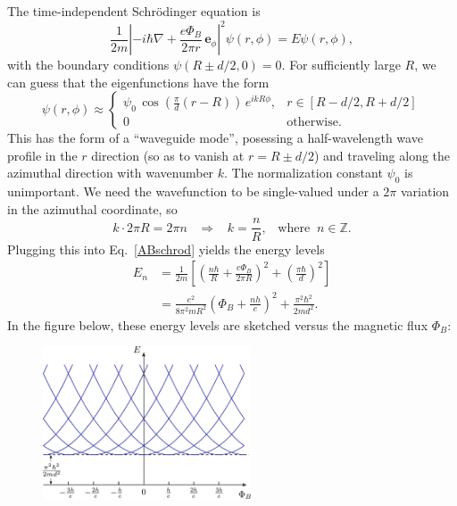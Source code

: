 \documentclass[pra,12pt]{revtex4}
\begin{document}
The time-independent Schr\"odinger equation is
\begin{equation}
  \frac{1}{2m}\left|-i\hbar\nabla+
  \frac{e\Phi_B}{2\pi r} \, \mathbf{e}_\phi\right|^2 \psi(r,\phi)
  = E\psi(r,\phi),
  \label{ABschrod}
\end{equation}
with the boundary conditions $\psi(R\pm d/2,0) = 0$.  For sufficiently
large $R$, we can guess that the eigenfunctions have the form
\begin{equation}
  \psi(r,\phi) \approx
  \begin{cases}
  \psi_0 \, \cos\left(\frac{\pi}{d}(r-R)\right)\, e^{i k R \phi},
  & r \in [R-d/2, R + d/2] \\
  0 & \textrm{otherwise}.
  \end{cases}
\end{equation}
This has the form of a ``waveguide mode'', posessing a half-wavelength
wave profile in the $r$ direction (so as to vanish at $r = R \pm d/2$)
and traveling along the azimuthal direction with wavenumber $k$.  The
normalization constant $\psi_0$ is unimportant.  We need the
wavefunction to be single-valued under a $2\pi$ variation in the
azimuthal coordinate, so
\begin{equation}
  k \cdot 2\pi R = 2\pi n \;\;\;\Rightarrow \;\;\; k = \frac{n}{R},
  \;\;\;\mathrm{where}\;\; n \in \mathbb{Z}.
\end{equation}
Plugging this into Eq.~\eqref{ABschrod} yields the energy levels
\begin{align}
  E_n &= \frac{1}{2m} \left[
    \left(\frac{n\hbar}{R} + \frac{e\Phi_B}{2\pi R}\right)^2
    + \left(\frac{\pi\hbar}{d}\right)^2 \right] \\
  &= \frac{e^2}{8\pi^2mR^2} \left(\Phi_B + \frac{nh}{e} \right)^2
  + \frac{\pi^2\hbar^2}{2md^2}.
  \label{abcurves}
\end{align}
In the figure below, these energy levels are sketched versus the
magnetic flux $\Phi_B$:

\begin{figure}[h]
  \centering\includegraphics[width=0.55\textwidth]{abring}
\end{figure}
\end{document}
